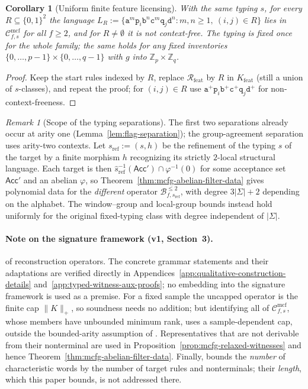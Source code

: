 \documentclass[11pt]{article}
\numberwithin{equation}{section}
\theoremstyle{plain}
\newtheorem{corollary}[theorem]{Corollary}
\theoremstyle{definition}
\theoremstyle{remark}
\newtheorem{remark}[theorem]{Remark}
\newcommand{\Cmcf}[2]{\mathcal{C}^{\mathrm{mcf}}_{#1,#2}}
\theoremstyle{plain}
\begin{document}
\begin{corollary}[Uniform finite feature licensing]
\label{cor:feature-relation-family}
With the \emph{same} typing $s$, for every $R\subseteq\{0,1\}^2$ the language
$L_R:=\{\mathtt a^m\mathtt p_i\mathtt b^n\mathtt c^m\mathtt q_j\mathtt d^n:m,n\ge1,
\ (i,j)\in R\}$ lies in $\Cmcf{f}{s}$ for all $f\ge2$, and for $R\ne\emptyset$ it is
not context-free.  The typing is fixed once for the whole family; the same holds for
any fixed inventories $\{0,\ldots,p-1\}\times\{0,\ldots,q-1\}$ with $g$ into
$\mathbb Z_p\times\mathbb Z_q$.
\end{corollary}

\begin{proof}
Keep the start rules indexed by $R$, replace $\mathcal R_{\mathrm{feat}}$ by $R$ in
$K_{\mathrm{feat}}$ (still a union of $s$-classes), and repeat the proof; for
$(i,j)\in R$ use $\mathtt a^+\mathtt p_i\mathtt b^+\mathtt c^+\mathtt q_j\mathtt d^+$
for non-context-freeness.
\end{proof}


\begin{remark}[Scope of the typing separations]
\label{rem:necessity-scope}
The first two separations already occur at arity one
(Lemma~\ref{lem:flag-separation}); the group-agreement separation uses
arity-two contexts.  Let $s_{\mathrm{ref}}:=(s,h)$ be the refinement of the
typing $s$ of the target by a finite morphism $h$ recognizing its strictly
$2$-local structural language.  Each target is then
$\widehat s_{\mathrm{ref}}^{-1}(\mathsf{Acc}')\cap\varphi^{-1}(0)$ for some
acceptance set $\mathsf{Acc}'$ and an abelian
$\varphi$, so Theorem~\ref{thm:mcfg-abelian-filter-data} gives polynomial
data for the \emph{different} operator $\mathcal B^{\le2}_{f,s_{\mathrm{ref}}}$, with
degree $3|\Sigma|+2$ depending on the alphabet.  The window--group and
local-group bounds instead hold uniformly for the original fixed-typing
class with degree independent of $|\Sigma|$.
\end{remark}

\paragraph{Note on the signature framework (v1, Section~3).}
of reconstruction operators.  The concrete grammar statements and their
adaptations are verified directly in
Appendices~\ref{app:qualitative-construction-details}
and~\ref{app:typed-witness-aux-proofs}; no embedding into the signature
framework is used as a premise.  For a fixed sample the uncapped operator
is the finite cap $\|K\|_+$, so soundness needs no addition; but identifying
all of $\Cmcf{f}{s}$, whose members have unbounded minimum rank, uses a
sample-dependent cap, outside the bounded-arity assumption of
\cite{Yoshinaka2015General}.  Representatives that are not derivable from
their nonterminal are used in Proposition~\ref{prop:mcfg-relaxed-witnesses}
and hence Theorem~\ref{thm:mcfg-abelian-filter-data}.  Finally,
\cite{Yoshinaka2015General} bounds the \emph{number} of characteristic words
by the number of target rules and nonterminals; their \emph{length}, which
this paper bounds, is not addressed there.
\end{document}
